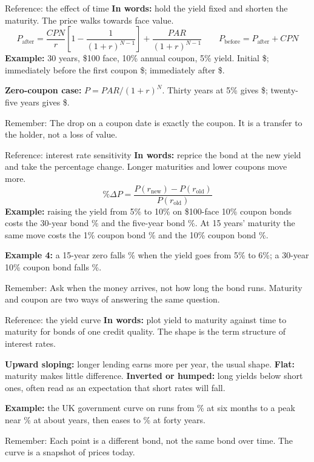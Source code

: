 \documentclass[10pt,aspectratio=169]{beamer}
\newcommand{\remember}[1]{\par\smallskip\alert{Remember:} #1}
\begin{document}
\begin{frame}[label=timeeffect]{Reference: the effect of time}
\textbf{In words:} hold the yield fixed and shorten the maturity. The price walks towards face value.
\[
P_{\text{after}}=\frac{CPN}{r}\left[1-\frac{1}{(1+r)^{N-1}}\right]+\frac{PAR}{(1+r)^{N-1}}
\qquad
P_{\text{before}}=P_{\text{after}}+CPN
\]
\textbf{Example:} 30 years, \$100 face, 10\% annual coupon, 5\% yield. Initial \$\LExThreeInitial; immediately before the first coupon \$\LExThreeBefore; immediately after \$\LExThreeAfter.
\par\smallskip
\textbf{Zero-coupon case:} $P=PAR/(1+r)^N$. Thirty years at 5\% gives \$\LZeroInitial; twenty-five years gives \$\LZeroLater.
\remember{The drop on a coupon date is exactly the coupon. It is a transfer to the holder, not a loss of value.}
\end{frame}

\begin{frame}[label=sensitivity]{Reference: interest rate sensitivity}
\textbf{In words:} reprice the bond at the new yield and take the percentage change. Longer maturities and lower coupons move more.
\[
\%\Delta P=\frac{P(r_{\text{new}})-P(r_{\text{old}})}{P(r_{\text{old}})}
\]
\textbf{Example:} raising the yield from 5\% to 10\% on \$100-face 10\% coupon bonds costs the 30-year bond \LThirtyA\% and the five-year bond \LFiveYrA\%. At 15 years' maturity the same move costs the 1\% coupon bond \LCouponOneA\% and the 10\% coupon bond \LCouponTenA\%.
\par\smallskip
\textbf{Example 4:} a 15-year zero falls \LExFourZeroChange\% when the yield goes from 5\% to 6\%; a 30-year 10\% coupon bond falls \LExFourCouponChange\%.
\remember{Ask when the money arrives, not how long the bond runs. Maturity and coupon are two ways of answering the same question.}
\end{frame}

\begin{frame}[label=yieldcurve]{Reference: the yield curve}
\textbf{In words:} plot yield to maturity against time to maturity for bonds of one credit quality. The shape is the term structure of interest rates.
\par\smallskip
\textbf{Upward sloping:} longer lending earns more per year, the usual shape. \textbf{Flat:} maturity makes little difference. \textbf{Inverted or humped:} long yields below short ones, often read as an expectation that short rates will fall.
\par\smallskip
\textbf{Example:} the UK government curve on \LCurveDate{} runs from \LCurveShort\% at six months to a peak near \LCurvePeak\% at about \LCurvePeakMaturity{} years, then eases to \LCurveLong\% at forty years.
\remember{Each point is a different bond, not the same bond over time. The curve is a snapshot of prices today.}
\end{frame}
\end{document}
